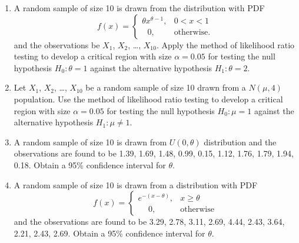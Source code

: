 \documentclass[11pt, a4paper]{article}
\begin{document}
\begin{enumerate}
	
	
	
	
	
	
	
	
	
	
	
	
	\item A random sample of size 10 is drawn from the distribution with PDF 
	\begin{equation*}
	f(x) = 
		\begin{cases}
		\theta x^{\theta - 1}, & 0 < x < 1 \\
		\hspace{8pt} 0, & \text{otherwise.}
		\end{cases}	
	\end{equation*}
	and the observations be $X_1$, $X_2$, \ldots, $X_{10}$. Apply the method of likelihood ratio testing to develop a critical region with size $\alpha = 0.05$ for testing the null hypothesis $H_0 : \theta = 1$ against the alternative hypothesis $H_1 : \theta = 2$.
	
	
	
	
	
	
	
	
	
	
	
	
	
	\item Let $X_1$, $X_2$, \ldots, $X_{10}$ be a random sample of size 10 drawn from a $N(\mu, 4)$ population. Use the method of likelihood ratio testing to develop a critical region with size $\alpha = 0.05$ for testing the null hypothesis $H_0 : \mu = 1$ against the alternative hypothesis $H_1 : \mu \neq 1$.
	
	
	
	
	
	
	
	
	
	\item A random sample of size 10 is drawn from $U(0, \theta)$ distribution and the observations are found to be 1.39, 1.69, 1.48, 0.99, 0.15, 1.12, 1.76, 1.79, 1.94, 0.18. Obtain a 95\% confidence interval for $\theta$.
	
	
	
	
	
	
	
	
	\item A random sample of size 10 is drawn from a distribution with PDF
	\begin{equation*}
	f(x) = 
		\begin{cases}
		e^{-\left(x-\theta\right)}, & x \geq \theta \\
		\hspace{15pt} 0, & \text{otherwise}
		\end{cases}	
	\end{equation*}
	and the observations are found to be 3.29, 2.78, 3.11, 2.69, 4.44, 2.43, 3.64, 2.21, 2.43, 2.69. Obtain a 95\% confidence interval for $\theta$.
\end{enumerate}
\end{document}
